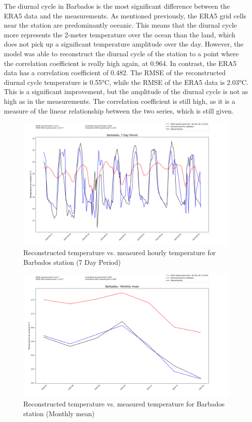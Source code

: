 The diurnal cycle in Barbados is the most significant difference between the ERA5 data and the measurements.
As mentioned previously, the ERA5 grid cells near the station are predominantly oceanic.
This means that the diurnal cycle more represents the 2-meter temperature over the ocean than the land, which does not pick up a significant temperature amplitude over the day.
However, the model was able to reconstruct the diurnal cycle of the station to a point where the correlation coefficient is really high again, at 0.964.
In contrast, the ERA5 data has a correlation coefficient of 0.482.
The RMSE of the reconstructed diurnal cycle temperature is 0.55°C, while the RMSE of the ERA5 data is 2.03°C.
This is a significant improvement, but the amplitude of the diurnal cycle is not as high as in the measurements.
The correlation coefficient is still high, as it is a measure of the linear relationship between the two series, which is still given.

\begin{figure}
    \centering
    \includegraphics[width=1.00\textwidth]{resources/images/charts/barbados_eval_grib_final/Barbados, 7 Day Period_1_2.png}
    \caption{Reconstructed temperature vs. measured hourly temperature for Barbados station (7 Day Period)}
\end{figure}

\begin{figure}
    \centering
    \includegraphics[width=1.00\textwidth]{resources/images/charts/barbados_eval_grib_final/Barbados - Monthly mean.png}
    \caption{Reconstructed temperature vs. measured temperature for Barbados station (Monthly mean)}
\end{figure}

